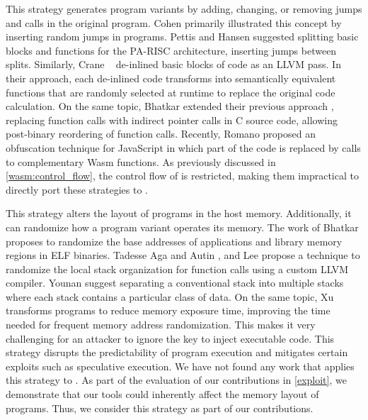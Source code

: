 This strategy generates program variants by adding, changing, or removing jumps and calls in the original program. Cohen \cite{cohen1993operating} primarily illustrated this concept by inserting random jumps in programs. Pettis and Hansen \cite{pettisochhansen} suggested splitting basic blocks and functions for the PA-RISC architecture, inserting jumps between splits.
Similarly, Crane \etal~\cite{crane2015thwarting} de-inlined basic blocks of code as an LLVM pass. 
In their approach, each de-inlined code transforms into semantically equivalent functions that are randomly selected at runtime to replace the original code calculation. 
On the same topic, Bhatkar \etal \cite{bhatkar2005efficient} extended their previous approach \cite{bhatkar03}, replacing function calls with indirect pointer calls in C source code, allowing post-binary reordering of function calls. 
Recently, Romano \etal \cite{wobfuscator} proposed an obfuscation technique for JavaScript in which part of the code is replaced by calls to complementary Wasm functions.
As previously discussed in \autoref{wasm:control_flow}, the control flow of \Wasm is restricted, making them impractical to directly port these strategies to \Wasm.

This strategy alters the layout of programs in the host memory. 
Additionally, it can randomize how a program variant operates its memory. 
The work of Bhatkar \etal \cite{bhatkar03, bhatkar2005efficient} proposes to randomize the base addresses of applications and library memory regions in ELF binaries. 
Tadesse Aga and Autin \cite{aga2019smokestack}, and Lee \etal \cite{lee2021savior} propose a technique to randomize the local stack organization for function calls using a custom LLVM compiler.
Younan \etal \cite{Younan2006} suggest separating a conventional stack into multiple stacks where each stack contains a particular class of data. 
On the same topic, Xu \etal \cite{xu2020merr} transforms programs to reduce memory exposure time, improving the time needed for frequent memory address randomization. 
This makes it very challenging for an attacker to ignore the key to inject executable code. 
This strategy disrupts the predictability of program execution and mitigates certain exploits such as speculative execution. 
We have not found any work that applies this strategy to \Wasm.
As part of the evaluation of our contributions in \autoref{exploit}, we demonstrate that our tools could inherently affect the memory layout of \Wasm programs.
Thus, we consider this strategy as part of our contributions.

